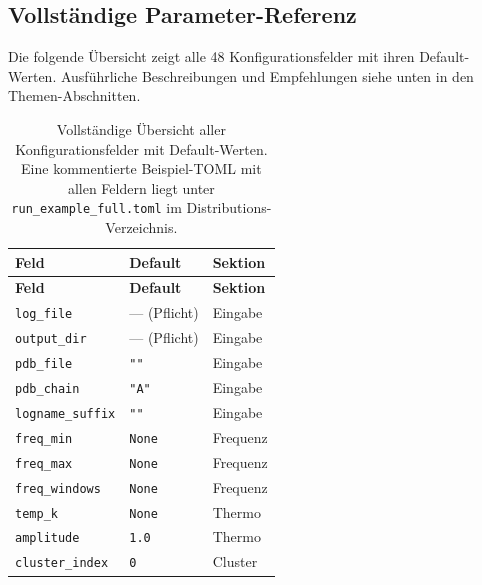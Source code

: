 \documentclass[11pt,a4paper,twoside]{article}
\theoremstyle{remark}
\begin{document}
\subsection{Vollst\"andige Parameter-Referenz}
\label{sec:param-referenz}

Die folgende \"Ubersicht zeigt alle 48 Konfigurationsfelder mit ihren
Default-Werten. Ausf\"uhrliche Beschreibungen und Empfehlungen siehe
unten in den Themen-Abschnitten.

\begin{longtable}{p{} p{} p{}}
\caption{Vollst\"andige \"Ubersicht aller Konfigurationsfelder mit
Default-Werten. Eine kommentierte Beispiel-TOML mit allen Feldern liegt
unter \texttt{run\_example\_full.toml} im Distributions-Verzeichnis.}
\label{tab:param-overview} \\
\toprule
\textbf{Feld} & \textbf{Default} & \textbf{Sektion} \\
\midrule
\endfirsthead
\toprule
\textbf{Feld} & \textbf{Default} & \textbf{Sektion} \\
\midrule
\endhead
\texttt{log\_file}                  & --- (Pflicht)        & Eingabe \\
\texttt{output\_dir}                & --- (Pflicht)        & Eingabe \\
\texttt{pdb\_file}                  & \texttt{""}          & Eingabe \\
\texttt{pdb\_chain}                 & \texttt{"A"}         & Eingabe \\
\texttt{logname\_suffix}            & \texttt{""}          & Eingabe \\
\midrule
\texttt{freq\_min}                  & \texttt{None}        & Frequenz \\
\texttt{freq\_max}                  & \texttt{None}        & Frequenz \\
\texttt{freq\_windows}              & \texttt{None}        & Frequenz \\
\midrule
\texttt{temp\_k}                    & \texttt{None}        & Thermo \\
\texttt{amplitude}                  & \texttt{1.0}         & Thermo \\
\midrule
\texttt{cluster\_index}             & \texttt{0}           & Cluster \\

\end{longtable}
\end{document}
